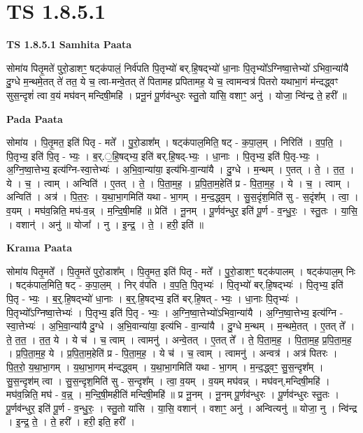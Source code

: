 \documentclass[17pt]{extarticle}
\begin{document}
\section{ TS 1.8.5.1 }

\textbf{TS 1.8.5.1 } \newline
\textbf{Samhita Paata} \newline

सोमा॑य पितृ॒मते॑ पुरो॒डाशꣳ॒॒ षट्क॑पालं॒ निर्व॑पति पि॒तृभ्यो॑ बर्.हि॒षद्भ्यो॑ धा॒नाः पि॒तृभ्यो᳚ऽग्निष्वा॒त्तेभ्यो॑ ऽभिवा॒न्या॑यै दु॒ग्धे म॒न्थमे॒तत् ते॑ तत॒ ये च॒ त्वा-मन्वे॒तत् ते॑ पितामह प्रपितामह॒ ये च॒ त्वामन्वत्र॑ पितरो यथाभा॒गं म॑न्दद्ध्वꣳ सुस॒न्दृशं॑ त्वा व॒यं मघ॑वन् मन्दिषी॒महि॑ । प्रनू॒नं पू॒र्णव॑न्धुरः स्तु॒तो या॑सि॒ वशाꣳ॒॒ अनु॑ । योजा॒ न्वि॑न्द्र ते॒ हरी᳚ ॥ \newline

\textbf{Pada Paata} \newline

सोमा॑य । पि॒तृ॒मत॒ इति॑ पितृ - मते᳚ । पु॒रो॒डाश᳚म् । षट्क॑पाल॒मिति॒ षट् - क॒पा॒ल॒म् । निरिति॑ । व॒प॒ति॒ । पि॒तृभ्य॒ इति॑ पि॒तृ - भ्यः॒ । ब॒र्.॒हि॒षद्भ्य॒ इति॑ बर्.हि॒षद्-भ्यः॒ । धा॒नाः । पि॒तृभ्य॒ इति॑ पि॒तृ-भ्यः॒ । अ॒ग्नि॒ष्वा॒त्तेभ्य॒ इत्य॑ग्नि-स्वा॒त्तेभ्यः॑ । अ॒भि॒वा॒न्या॑या॒ इत्य॑भि-वा॒न्या॑यै । दु॒ग्धे । म॒न्थम् । ए॒तत् । ते॒ । त॒त॒ । ये । च॒ । त्वाम् । अन्विति॑ । ए॒तत् । ते॒ । पि॒ता॒म॒ह॒ । प्र॒पि॒ता॒म॒हेति॑ प्र - पि॒ता॒म॒ह॒ । ये । च॒ । त्वाम् । अन्विति॑ । अत्र॑ । पि॒त॒रः॒ । य॒था॒भा॒गमिति॑ यथा - भा॒गम् । म॒न्द॒द्ध्व॒म् । सु॒स॒दृंश॒मिति॑ सु - स॒दृंश᳚म् । त्वा॒ । व॒यम् । मघ॑व॒न्निति॒ मघ॑-व॒न्न् । म॒न्दि॒षी॒महि॑ ॥ प्रेति॑ । नू॒नम् । पू॒र्णव॑न्धुर॒ इति॑ पू॒र्ण - व॒न्धु॒रः॒ । स्तु॒तः । या॒सि॒ । वशान्॑ । अनु॑ ॥ योजा᳚ । नु । इ॒न्द्र॒ । ते॒ । हरी॒ इति॑ ॥  \newline


\textbf{Krama Paata} \newline

सोमा॑य पितृ॒मते᳚ । पि॒तृ॒मते॑ पुरो॒डाश᳚म् । पि॒तृ॒मत॒ इति॑ पितृ - मते᳚ । पु॒रो॒डाशꣳ॒॒ षट्क॑पालम् । षट्क॑पाल॒म् निः । षट्क॑पाल॒मिति॒ षट् - क॒पा॒ल॒म् । निर् व॑पति । व॒प॒ति॒ पि॒तृभ्यः॑ । पि॒तृभ्यो॑ बर्.हि॒षद्भ्यः॑ । पि॒तृभ्य॒ इति॑ पि॒तृ - भ्यः॒ । ब॒र्॒.हि॒षद्भ्यो॑ धा॒नाः । ब॒र्॒.हि॒षद्भ्य॒ इति॑ बर्.हि॒षत् - भ्यः॒ । धा॒नाः पि॒तृभ्यः॑ । पि॒तृभ्यो᳚ऽग्निष्वा॒त्तेभ्यः॑ । पि॒तृभ्य॒ इति॑ पि॒तृ - भ्यः॒ । अ॒ग्नि॒ष्वा॒त्तेभ्यो॑ऽभिवा॒न्या॑यै । अ॒ग्नि॒ष्वा॒त्तेभ्य॒ इत्य॑ग्नि - स्वा॒त्तेभ्यः॑ । अ॒भि॒वा॒न्या॑यै दु॒ग्धे । अ॒भि॒वान्या॑या॒ इत्य॑भि - वा॒न्या॑यै । दु॒ग्धे म॒न्थम् । म॒न्थमे॒तत् । ए॒तत् ते᳚ । 
ते॒ त॒त॒ । त॒त॒ ये । ये च॑ । च॒ त्वाम् । त्वामनु॑ । अन्वे॒तत् । ए॒तत् ते᳚ । ते॒ पि॒ता॒म॒ह॒ । पि॒ता॒म॒ह॒ प्र॒पि॒ता॒म॒ह॒ । प्र॒पि॒ता॒म॒ह॒ ये । प्र॒पि॒ता॒म॒हेति॑ प्र - पि॒ता॒म॒ह॒ । ये च॑ । च॒ त्वाम् । त्वामनु॑ । अन्वत्र॑ । अत्र॑ पितरः । पि॒त॒रो॒ य॒था॒भा॒गम् । य॒था॒भा॒गम् म॑न्दद्ध्वम् । य॒था॒भा॒गमिति॑ यथा - भा॒गम् । म॒न्द॒द्ध्वꣳ॒॒ सु॒स॒न्दृश᳚म् । सु॒स॒न्दृश॑म् त्वा । सु॒स॒न्दृश॒मिति॑ सु - स॒न्दृश᳚म् । त्वा॒ व॒यम् । व॒यम् मघ॑वन्न् । मघ॑वन्,मन्दिषी॒महि॑ । मघ॑व॒न्निति॒ मघ॑ - व॒न्न्॒ । म॒न्दि॒षी॒महीति॑ मन्दिषी॒महि॑ ॥ प्र नू॒नम् । नू॒नम् पू॒र्णव॑न्धुरः । पू॒र्णव॑न्धुरः स्तु॒तः । पू॒र्णव॑न्धुर॒ इति॑ पू॒र्ण - व॒न्धु॒रः॒ । स्तु॒तो या॑सि । या॒सि॒ वशान्॑ । वशाꣳ॒॒ अनु॑ । अन्वित्यनु॑ ॥ योजा॒ नु । न्वि॑न्द्र । इ॒न्द्र॒ ते॒ । ते॒ हरी᳚ । हरी॒ इति॒ हरी᳚ । \newline
\end{document}
